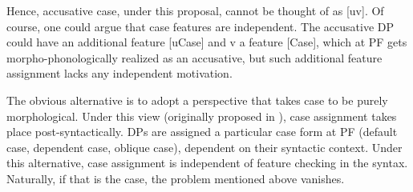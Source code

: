 \documentclass[output=paper
,modfonts
,nonflat]{langsci/langscibook}
\begin{document}
\begin{figure}[!h]
	\begin{exe}
	\end{exe}
\end{figure}
\noindent Hence, accusative case, under this proposal, cannot be thought of as [uv]. Of course, one could argue that case features are independent. The accusative DP could have an additional feature [uCase] and v a feature [Case], which at PF gets morpho-phonologically realized as an accusative, but such additional feature assignment lacks any independent motivation.

The obvious alternative is to adopt a perspective that takes case to be purely morphological. Under this view (originally proposed in \citealt{Marantz1991}), case assignment takes place post-syntactically. DPs are assigned a particular case form at PF (default case, dependent case, oblique case), dependent on their syntactic context. Under this alternative, case assignment is independent of feature checking in the syntax. Naturally, if that is the case, the problem mentioned above vanishes.
\end{document}
